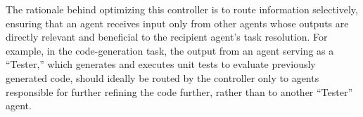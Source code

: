 The rationale behind optimizing this controller is to route information selectively, ensuring that an agent receives input only from other agents whose outputs are directly relevant and beneficial to the recipient agent's task resolution. For example, in the code-generation task, the output from an agent serving as a ``Tester,'' which generates and executes unit tests to evaluate previously generated code, should ideally be routed by the controller only to agents responsible for further refining the code further, rather than to another ``Tester'' agent.






